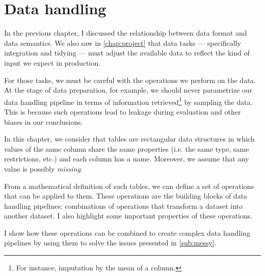 \chapter{Data handling}
\label{chap:handling}



In the previous chapter, I discussed the relationship between data format and data
semantics.  We also saw in \cref{chap:project} that data tasks --- specifically
integration and tidying --- must adjust the available data to reflect the kind of
input we expect in production.

For those tasks, we must be careful with the operations we perform on the data. At the
stage of data preparation, for example, we should never parametrize our data handling
pipeline in terms of information retrieved\footnote{For instance, imputation by the mean
of a column.} by sampling the data.  This is because such operations lead to \gls{leakage}
during evaluation and other biases in our conclusions.

In this chapter, we consider that tables are rectangular data structures in which values
of the same column share the same properties (i.e. the same type, same restrictions, etc.)
and each column has a name.  Moreover, we assume that any value is possibly
\emph{missing}.

From a mathematical definition of such tables, we can define a set of operations that can
be applied to them.  These operations are the building blocks of data handling pipelines:
combinations of operations that transform a dataset into another dataset.
I also highlight some important properties of these operations.

I show how these operations can be combined to create complex data handling pipelines by
using them to solve the issues presented in \cref{sub:messy}.

